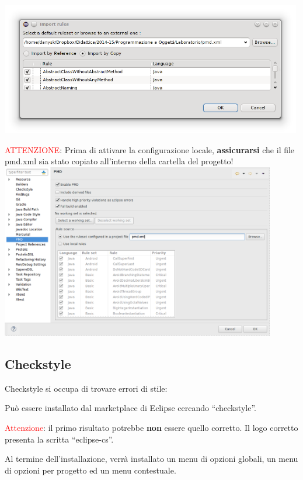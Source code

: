 \documentclass[presentation]{beamer}
\begin{document}
 {
	\centering
	\includegraphics[width=0.99\textwidth]{img/pmdimport}
}

 {
	\textcolor{red}{ATTENZIONE}: Prima di attivare la configurazione locale, \textbf{assicurarsi} che il file pmd.xml sia stato copiato all'interno della cartella del progetto!
	\centering
	\includegraphics[width=0.9\textwidth]{img/pmdproj}
}


\subsection{Checkstyle}

 {
	 {
		Checkstyle si occupa di trovare errori di stile:
	}
}

 {
	 {
		Può essere installato dal marketplace di Eclipse cercando ``checkstyle''.
		
		\textcolor{red}{Attenzione}: il primo risultato potrebbe \textbf{non} essere quello corretto. Il logo corretto presenta la scritta ``eclipse-cs''.

		Al termine dell'installazione, verrà  installato un menu di opzioni globali, un menu di opzioni per progetto ed un menu contestuale.
	}
}
\end{document}

